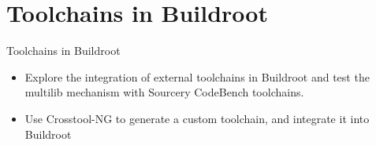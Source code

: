 \section{Toolchains in Buildroot}

\setuplabframe
{Toolchains in Buildroot}
{
  \begin{itemize}
  \item Explore the integration of external toolchains in Buildroot
    and test the multilib mechanism with Sourcery CodeBench toolchains.
  \item Use Crosstool-NG to generate a custom toolchain, and integrate
    it into Buildroot
  \end{itemize}
}
